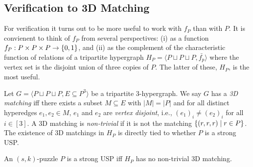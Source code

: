 \documentclass[11pt]{article}
\newcommand\sse{\subseteq}
\newcommand\condset[2]{\set{#1 \;|\; #2}}
\begin{document}


\subsection{Verification to 3D Matching}
\label{sec:3DM}

For verification it turns out to be more useful to work with $f_P$
than with $P$.  It is convienent to think of $f_P$ from several
perspectives: (i) as a function $f_P : P \times P \times P \rightarrow
\left\{ 0, 1 \right\}$,
and (ii) as the complement of the
characteristic function of relations of a tripartite
hypergraph $H_P = \langle P \sqcup P \sqcup P, \bar{f_p}\rangle$ where
the vertex set is the disjoint union of three copies of $P$.  The latter of these, $H_P$, is the most useful.

Let $G = \langle P \sqcup P \sqcup P, E \sse P^3\rangle$ be a
tripartite 3-hypergraph.  We say $G$ has a \emph{3D matching} iff
there exists a subset $M \sse E$ with $|M| = |P|$ and for all distinct
hyperedges $e_1, e_2 \in M$, $e_1$ and $e_2$ are \emph{vertex
  disjoint}, i.e., $(e_1)_i \neq (e_2)_i$ for all $i \in [3]$.  A 3D matching is \emph{non-trivial} if it is not the matching
$\condset{(r,r,r)}{r \in P}$.  The existence of 3D matchings in $H_P$
is directly tied to whether $P$ is a strong USP.

\begin{lemma}
  \label{lem:verify-to-3dm}
  An $(s,k)$-puzzle $P$ is a strong USP iff $H_P$ has no non-trivial 3D
  matching.
\end{lemma}
\end{document}
